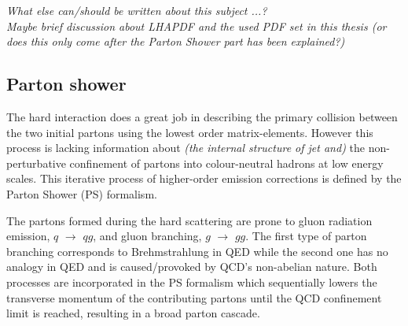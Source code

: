 \textit{What else can/should be written about this subject ...?}\\
\textit{Maybe brief discussion about LHAPDF and the used PDF set in this thesis (or does this only come after the Parton Shower part has been explained?)}

\subsection{Parton shower} \label{sec::PS}

The hard interaction does a great job in describing the primary collision between the two initial partons using the lowest order matrix-elements. However this process is lacking information about \textit{(the internal structure of jet and)} the non-perturbative confinement of partons into colour-neutral hadrons at low energy scales. This iterative process of higher-order emission corrections is defined by the Parton Shower (PS) formalism.

The partons formed during the hard scattering are prone to gluon radiation emission, $q$ $\rightarrow$ $qg$, and gluon branching, $g$ $\rightarrow$ $gg$. The first type of parton branching corresponds to Brehmstrahlung in QED while the second one has no analogy in QED and is caused/provoked by QCD's non-abelian nature. Both processes are incorporated in the PS formalism which sequentially lowers the transverse momentum of the contributing partons until the QCD confinement limit is reached, resulting in a broad parton cascade.
\\

